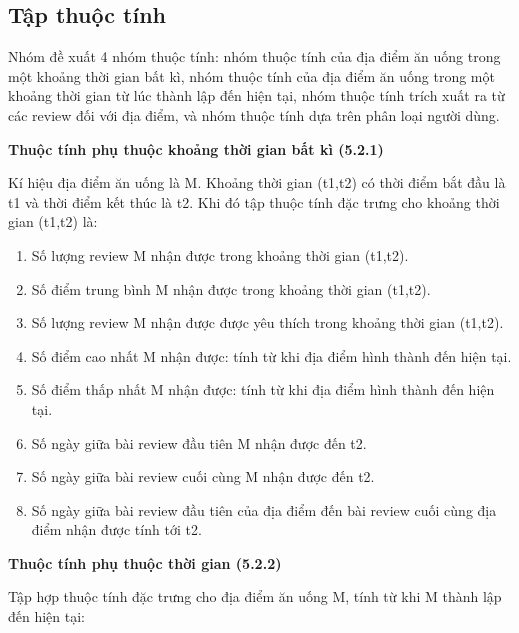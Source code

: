 \documentclass[12pt]{extarticle}
\begin{document}
		\subsection{Tập thuộc tính}
			\par Nhóm đề xuất 4 nhóm thuộc tính: nhóm thuộc tính của địa điểm ăn uống trong một khoảng thời gian bất kì, nhóm thuộc tính của địa điểm ăn uống trong một khoảng thời gian từ lúc thành lập đến hiện tại, nhóm thuộc tính trích xuất ra từ các review đối với địa điểm, và nhóm thuộc tính dựa trên phân loại người dùng. 
			\par \textbf{Thuộc tính phụ thuộc khoảng thời gian bất kì (5.2.1)}
				\par Kí hiệu địa điểm ăn uống là M. Khoảng thời gian (t1,t2) có thời điểm bắt đầu là t1 và thời điểm kết thúc là t2. Khi đó tập thuộc tính đặc trưng cho khoảng thời gian (t1,t2) là:
				\begin{enumerate}
					\item Số lượng review M nhận được trong khoảng thời gian (t1,t2).
					\item Số điểm trung bình M nhận được trong khoảng thời gian (t1,t2).
					\item Số lượng review M nhận được được yêu thích trong khoảng thời gian (t1,t2).
					\item Số điểm cao nhất M nhận được: tính từ khi địa điểm hình thành đến hiện tại.	
					\item Số điểm thấp nhất M nhận được: tính từ khi địa điểm hình thành đến hiện tại.
					\item Số ngày giữa bài review đầu tiên M nhận được đến t2.
					\item Số ngày giữa bài review cuối cùng M nhận được đến t2.
					\item Số ngày giữa bài review đầu tiên của địa điểm đến bài review cuối cùng địa điểm nhận được tính tới t2.
				\end{enumerate}
			\par \textbf{Thuộc tính phụ thuộc thời gian (5.2.2)}
				\par Tập hợp thuộc tính đặc trưng cho địa điểm ăn uống M, tính từ khi M thành lập đến hiện tại:
\end{document}
